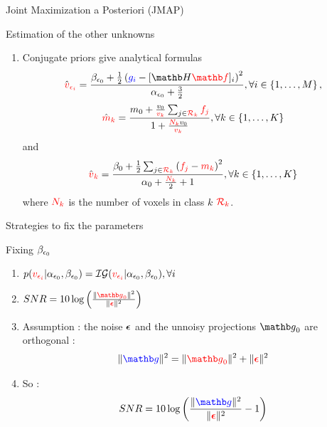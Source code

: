 \documentclass[latex]{beamer}
\def\beq{\[} \def\eeq{\]}
\begin{document}
\begin{frame}{Joint Maximization a Posteriori (JMAP)}
\begin{block}{Estimation of the other unknowns}
\begin{enumerate}
\item Conjugate priors give analytical formulas
\beq
\hat{\red{v}}_{\red{\epsilon_{i}}}=\frac{\betaez+\frac{1}{2}\left(\blue{g_{i}}-\lbrack\Hb\rfb\rbrack_{i}\right)^{2}}{\alphaez+\frac{3}{2}}, \forall i \in \left\{ 1, \dots, M \right\},
\eeq
\beq
\hat{\red{m}}_{\red{k}}=\frac{m_0+\frac{v_0}{\red{v_{k}}}\sum_{j \in \red{\Rc_{k}}}\red{f_{j}}}{1+\frac{\red{N_{k}}v_0}{\red{v_{k}}}}, \forall k \in \left\{ 1, \dots, K \right\}
\eeq
and
\beq
\hat{\red{v}}_{\red{k}}=\frac{\beta_0+\frac{1}{2}\sum_{j \in \red{\Rc_{k}}}\left(\red{f_{j}}-\red{m_{k}}\right)^{2}}{\alpha_0+\frac{\red{N_{k}}}{2}+1}, \forall k \in \left\{ 1, \dots, K \right\}
\eeq
where ${\color{red}N_k}$ is the number of voxels in class $k$ ${\color{red}{\ensuremath{\mathcal{R}}}_k}$.
\end{enumerate}
\end{block}
\end{frame}

\begin{frame}{Strategies to fix the parameters}
\begin{block}{Fixing $\beta_{\epsilon_0}$}
\begin{enumerate}
\item $p({\color{red}v_{\epsilon_{i}}}|\alpha_{\epsilon_0},\beta_{\epsilon_0})={\mathcal{I}}{\mathcal{G}}({\color{red}v_{\epsilon_{i}}}|\alpha_{\epsilon_0},\beta_{\epsilon_0}), \forall i$
\item $SNR=10\log\left(\frac{\|\red{\gb_{0}}\|^{2}}{\|\red{\epsilonb}\|^{2}}\right)$
\item Assumption : the noise ${\boldsymbol{\epsilon}}$ and the unnoisy projections $\gb_{0}$ are orthogonal :
\beq
\|\bgb\|^{2}=\|\red{\gb_{0}}\|^{2}+\|\red{\epsilonb}\|^{2}
\label{eq:Noise and unnoisy data orthogonal}
\eeq
\item So : 
\beq
SNR=10\log\left(\frac{\|\bgb\|^{2}}{\|\red{\epsilonb}\|^{2}}-1\right)
\eeq
\end{enumerate}
\end{block}
\end{frame}
\end{document}
